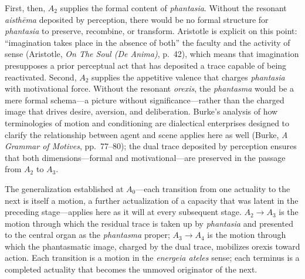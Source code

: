 \documentclass[12pt]{article}
\begin{document}
First, then, $A_2$ supplies the formal content of \textit{phantasia}. Without the resonant \textit{aisthēma} deposited by perception, there would be no formal structure for \textit{phantasia} to preserve, recombine, or transform. Aristotle is explicit on this point: ``imagination takes place in the absence of both'' the faculty and the activity of sense (Aristotle, \textit{On The Soul (De Anima)}, p.~42), which means that imagination presupposes a prior perceptual act that has deposited a trace capable of being reactivated. Second, $A_2$ supplies the appetitive valence that charges \textit{phantasia} with motivational force. Without the resonant \textit{orexis}, the \textit{phantasma} would be a mere formal schema---a picture without significance---rather than the charged image that drives desire, aversion, and deliberation. Burke's analysis of how terminologies of motion and conditioning are dialectical enterprises designed to clarify the relationship between agent and scene applies here as well (Burke, \textit{A Grammar of Motives}, pp.~77--80); the dual trace deposited by perception ensures that both dimensions---formal and motivational---are preserved in the passage from $A_2$ to $A_3$.

The generalization established at $A_0$---each transition from one actuality to the next is itself a motion, a further actualization of a capacity that was latent in the preceding stage---applies here as it will at every subsequent stage. $A_2 \to A_3$ is the motion through which the residual trace is taken up by \textit{phantasia} and presented to the central organ as the \textit{phantasma} proper; $A_3 \to A_4$ is the motion through which the phantasmatic image, charged by the dual trace, mobilizes orexis toward action. Each transition is a motion in the \textit{energeia ateles} sense; each terminus is a completed actuality that becomes the unmoved originator of the next.
\end{document}
